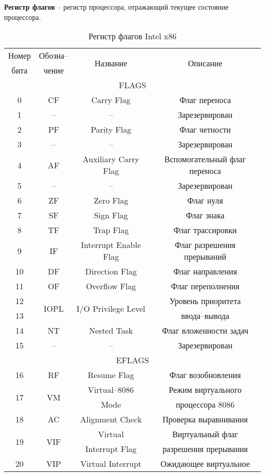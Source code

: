 \textbf{Регистр флагов} -- регистр процессора, отражающий текущее состояние процессора.
\begin{table}[h]
\centering
\caption{Регистр флагов Intel x86}
\label{tab:Flags}
\begin{tabular}{|c|c|c|c|}
\hline
Номер & Обозна-- & \multirow{2}{*}{Название} & \multirow{2}{*}{Описание} \\
бита & чение & &
\\\hline
\multicolumn{4}{|c|}{FLAGS} \\
\hline
 0 & CF & Carry Flag & Флаг переноса
\\ 1 & -- & -- & Зарезервирован
\\ 2 & PF & Parity Flag & Флаг четности
\\ 3 & -- & -- & Зарезервирован
\\ 4 & AF & Auxiliary Carry Flag & Вспомогательный флаг переноса
\\ 5 & -- & -- & Зарезервирован
\\ 6 & ZF & Zero Flag & Флаг нуля
\\ 7 & SF & Sign Flag & Флаг знака
\\ 8 & TF & Trap Flag & Флаг трассировки
\\ 9 & IF & Interrupt Enable Flag & Флаг разрешения прерываний
\\ 10 & DF & Direction Flag & Флаг направления
\\ 11 & OF & Overflow Flag & Флаг переполнения
\\ 12 & \multirow{2}{*}{IOPL} & \multirow{2}{*}{I/O Privilege Level} & Уровень приоритета
\\ 13 & & &  ввода--вывода
\\ 14 & NT & Nested Task & Флаг вложенности задач
\\ 15 & -- & -- & Зарезервирован
\\\hline
\multicolumn{4}{|c|}{EFLAGS} \\
\hline
   16 & RF & Resume Flag & Флаг возобновления
\\ \multirow{2}{*}{17} & \multirow{2}{*}{VM} & Virtual--8086 & Режим виртуального
\\ & & Mode & процессора 8086
\\ 18 & AC & Alignment Check & Проверка выравнивания
\\ \multirow{2}{*}{19} &  \multirow{2}{*}{VIF} & Virtual & Виртуальный флаг
\\ & & Interrupt Flag & разрешения прерывания
\\ \multirow{2}{*}{20} & \multirow{2}{*}{VIP} & Virtual Interrupt & Ожидающее виртуальное

\end{tabular}
\end{table}
